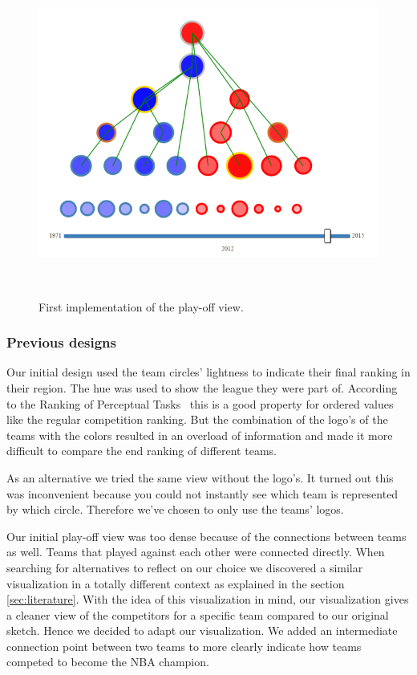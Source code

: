 \documentclass[]{sigchi}
\begin{document}
\begin{figure}
\centering
  \includegraphics[width=0.9\columnwidth]{figures/playoffviewfirstimplemantation}
  \caption{First implementation of the play-off view.}~\label{fig:firstimplementationplayoffview}
\end{figure}


\subsubsection{Previous designs}
Our initial design used the team circles' lightness to indicate their final
ranking in their region. The hue was used to show the league they were part of.
According to the Ranking of Perceptual Tasks~\cite{automatingdesign} this is a
good property for ordered values like the regular competition ranking. But the
combination of the logo's of the teams with the colors resulted in an overload
of information and made it more difficult to compare the end ranking of
different teams. 

As an alternative we tried the same view without the logo's. It turned out this 
was inconvenient because you could not instantly see which team is represented 
by which circle. Therefore we've chosen to only use the teams' logos.

Our initial play-off view was too dense because of the connections between teams
as well. Teams that played against each other were connected directly. When
searching for alternatives to reflect on our choice we discovered a similar
visualization in a totally different context\cite{whitehousepath} as explained in 
the section \ref{sec:literature}. With the idea of this visualization in mind, our 
visualization gives a cleaner view of the competitors for a specific team compared 
to our original sketch. Hence we decided to adapt our visualization. We added an 
intermediate connection point between two teams to more clearly indicate how teams competed to 
become the NBA champion.
\end{document}
